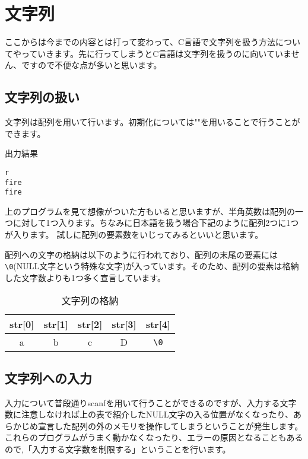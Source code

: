 \section{文字列}
ここからは今までの内容とは打って変わって、C言語で文字列を扱う方法についてやっていきます。先に行ってしまうとC言語は文字列を扱うのに向いていません、ですので不便な点が多いと思います。

\subsection{文字列の扱い}
文字列は配列を用いて行います。初期化については""を用いることで行うことができます。



\begin{itembox}{出力結果}
\begin{verbatim}
r
fire
fire
\end{verbatim}
\end{itembox}
上のプログラムを見て想像がついた方もいると思いますが、半角英数は配列の一つに対して1つ入ります。ちなみに日本語を扱う場合下記のように配列2つに1つが入ります。
試しに配列の要素数をいじってみるといいと思います。




配列への文字の格納は以下のように行われており、配列の末尾の要素には\verb+\0+(NULL文字という特殊な文字)が入っています。そのため、配列の要素は格納した文字数よりも1つ多く宣言しています。

\begin{table}[htb]
\begin{center}
\begin{tabular}{|c|c|c|c|c|}
\hline
str[0] & str[1]& str[2] &str[3]&str[4] \\ \hline
 a&b &c &D &\verb|\0|  \\ \hline


\end{tabular}
\caption{ 文字列の格納}
\end{center}
\end{table}

\subsection{文字列への入力}
入力について普段通りscanfを用いて行うことができるのですが、入力する文字数に注意しなければ上の表で紹介したNULL文字の入る位置がなくなったり、あらかじめ宣言した配列の外のメモリを操作してしまうということが発生します。これらのプログラムがうまく動かなくなったり、エラーの原因となることもあるので,「入力する文字数を制限する」ということを行います。

